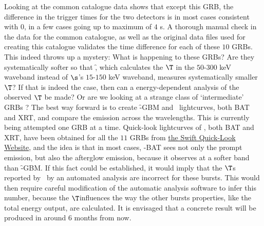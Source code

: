 Looking at the common catalogue data shows that except this GRB, the difference in the trigger times for the two detectors is in most cases consistent with $0$, in a few cases going up to maximum of $4$ s. A thorough manual check in the data for the common catalogue, as well as the original data files used for creating this catalogue validates the time difference for each of these $10$ GRBs. This indeed throws up a mystery: What is happening to these GRBs? Are they systematically softer so that \f, which calculates the $\T$ in the $50$-$300$ keV waveband instead of $\s$'s $15$-$150$ keV waveband, measures systematically smaller $\T$? If that is indeed the case, then can a energy-dependent analysis of the observed $\T$ be made? Or are we looking at a strange class of `intermediate' GRBs \citep{Horvath_&_Toth-2016-Ap&SS}? The best way forward is to create \f -GBM and \s\ lightcurves, both BAT and XRT, and compare the emission across the wavelengths. This is currently being attempted one GRB at a time. Quick-look lightcurves of \s, both BAT and XRT, have been obtained for all the $11$ GRBs from \href{http://www.swift.ac.uk/burst_analyser/}{the Swift Quick-Look Website}, and the idea is that in most cases, \s -BAT sees not only the prompt emission, but also the afterglow emission, because it observes at a softer band than \f -GBM. If this fact could be established, it would imply that the $\T$s reported by \s\ by an automated analysis are incorrect for these bursts. This would then require careful modification of the automatic analysis software to infer this number, because the $\T$influences the way the other bursts properties, like the total energy output, are calculated. It is envisaged that a concrete result will be produced in around $6$ months from now.